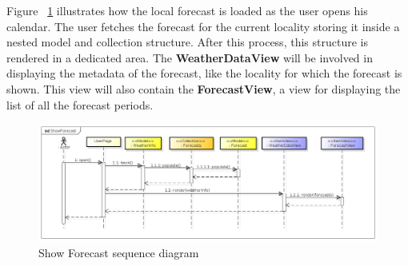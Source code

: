 Figure ~\ref{fig:forecasteq} illustrates how the local forecast is loaded as the user opens his calendar. The user fetches the forecast for the current locality storing it inside a nested model and collection structure. After this process, this structure is rendered in a dedicated area. The \textbf{WeatherDataView} will be involved in displaying the metadata of the forecast, like the locality for which the forecast is shown. This view will also contain the \textbf{ForecastView}, a view for displaying the list of all the forecast periods.
 \begin{center}
 \begin{figure}[H]
    \includegraphics[width=1\textwidth]{./BCEDiagram/BCE/EntityOverview/ShowForecast.png}
    \caption{Show Forecast sequence diagram}
     \label{fig:forecasteq}
     \end{figure}
   \end{center} 
   
